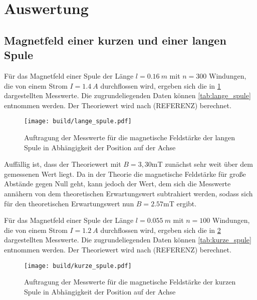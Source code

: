\section{Auswertung}
\label{sec:Auswertung}

\subsection{Magnetfeld einer kurzen und einer langen Spule}

Für das Magnetfeld einer Spule der Länge $l=\SI{0,16}{m}$ mit $n=300$ Windungen,
die von einem Strom $I=\SI{1,4}{A}$ durchflossen wird, ergeben sich die in
\ref{fig:lange_spule} dargestellten Messwerte. Die zugrundeliegenden Daten können
\ref{tab:lange_spule} entnommen werden. Der Theoriewert wird nach (REFERENZ) berechnet.

\begin{figure}
  \centering
  \texttt{[image: build/lange\_spule.pdf]}
  \caption{Auftragung der Messwerte für die magnetische Feldstärke der langen Spule
  in Abhängigkeit der Position auf der Achse}
  \label{fig:lange_spule}
\end{figure}

Auffällig ist, dass der Theoriewert mit $B=3,30$mT zunächst sehr weit über dem
gemessenen Wert liegt. Da in der Theorie die magnetische Feldstärke für große Abstände
gegen Null geht, kann jedoch der Wert, dem sich die Messwerte annähern von dem theoretischen
Erwartungswert subtrahiert werden, sodass sich für den theoretischen Erwartungswert
nun $B=2.57$mT ergibt.


Für das Magnetfeld einer Spule der Länge $l=\SI{0,055}{m}$ mit $n=100$ Windungen,
die von einem Strom $I=\SI{1,2}{A}$ durchflossen wird, ergeben sich die in
\ref{fig:kurze_spule} dargestellten Messwerte. Die zugrundeliegenden Daten können
\ref{tab:kurze_spule} entnommen werden. Der Theoriewert wird nach (REFERENZ) berechnet.

\begin{figure}
  \centering
  \texttt{[image: build/kurze\_spule.pdf]}
  \caption{Auftragung der Messwerte für die magnetische Feldstärke der kurzen Spule
  in Abhängigkeit der Position auf der Achse}
  \label{fig:kurze_spule}
\end{figure}

